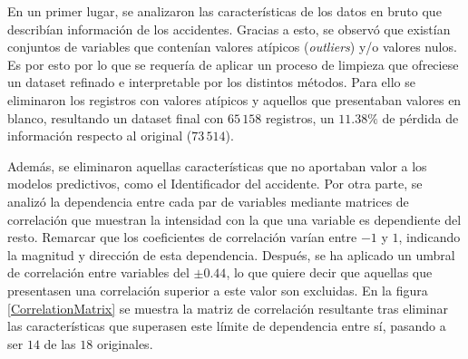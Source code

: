 \documentclass{uathesis-es}
\begin{document}
{		%
		
		
		En un primer lugar, se analizaron las características de los datos en bruto que describían información de los accidentes. Gracias a esto, se observó que existían conjuntos de variables que contenían valores atípicos (\textit{outliers}) y/o valores nulos. Es por esto por lo que se requería de aplicar un proceso de limpieza que ofreciese un dataset refinado e interpretable por los distintos métodos. Para ello se eliminaron los registros con valores atípicos y aquellos que presentaban valores en blanco, resultando un dataset final con $65\,158$ registros, un $11.38\%$ de pérdida de información respecto al original ($73\,514$).
		
		
		Además, se eliminaron aquellas características que no aportaban valor a los modelos predictivos, como el Identificador del accidente. Por otra parte, se analizó la dependencia entre cada par de variables mediante matrices de correlación que muestran la intensidad con la que una variable es dependiente del resto. Remarcar que los coeficientes de correlación varían entre $-1$ y $1$, indicando la magnitud y dirección de esta dependencia. Después, se ha aplicado un umbral de correlación entre variables del $\pm 0.44$, lo que quiere decir que aquellas que presentasen una correlación superior a este valor son excluidas. En la figura \ref{CorrelationMatrix} se muestra la matriz de correlación resultante tras eliminar las características que superasen este límite de dependencia entre sí, pasando a ser $14$ de las $18$ originales.
		
}
\end{document}
